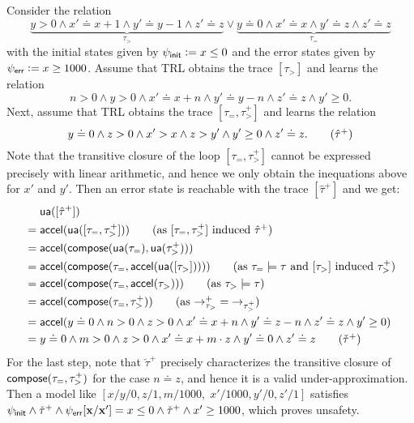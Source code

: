 \begin{example}
  Consider the relation
  \[
    \underbrace{y > 0 \land x' \doteq x + 1 \land y' \doteq y - 1 \land z' \doteq z}_{\tau_>} {} \lor {} \underbrace{y \doteq 0 \land x' \doteq x \land y' \doteq z \land z' \doteq z}_{\tau_=} \tag{$\tau$}
  \]
  with the initial states given by $\psi_{\mathsf{init}} \mathrel{\mathop:}= x \leq 0$ and the error states given
  by
  $\psi_{\mathsf{err}} \mathrel{\mathop:}= x \geq 1000$.
  Assume that TRL obtains the trace $[\tau_>]$ and learns the relation
  \begin{equation}
    \label{eq:unsafe-learned1}
    n > 0 \land y > 0 \land x' \doteq x + n \land y' \doteq y - n \land z' \doteq z \land y' \geq 0. \tag{$\tau_>^+$}
  \end{equation}
  Next, assume that TRL obtains the trace $[\tau_=,\tau_>^+]$ and learns the relation
  \begin{equation}
    \label{eq:unsafe-learned1}
    y \doteq 0 \land z > 0 \land x' > x \land z > y' \land y' \geq 0 \land z' \doteq z. \tag{$\hat{\tau}^+$}
  \end{equation}
  Note that the transitive closure of the loop $[\tau_=,\tau_>^+]$ cannot be expressed precisely with linear arithmetic, and hence we only obtain the inequations above for $x'$ and $y'$.
  Then an error state is reachable with the trace $[\hat{\tau}^+]$ and we\report{
    \pagebreak[3]} get:
  \begin{align*}
    & \underapprox([\hat{\tau}^+]) \\
    {} = {} & \accel(\underapprox([\tau_=,\tau_>^+])) \tag{as $[\tau_=,\tau_>^+]$ induced $\hat{\tau}^+$} \\
    {} = {} & \accel(\compose(\underapprox(\tau_=),\underapprox(\tau_>^+))) \\
    {} = {} & \accel(\compose(\tau_=,\accel(\underapprox([\tau_>])))) \tag{as $\tau_= \models \tau$ and $[\tau_>]$ induced $\tau_>^+$} \\
    {} = {} & \accel(\compose(\tau_=,\accel(\tau_>))) \tag{as $\tau_> \models \tau$}\\
    {} = {} & \accel(\compose(\tau_=,\tau^+_>)) \tag{as ${\to_{\tau_>}^+} = {\to_{\tau^+_>}}$} \\
    {} = {} & \accel(y \doteq 0 \land n > 0 \land z > 0 \land x' \doteq x + n \land y' \doteq z - n \land z' \doteq z \land y' \geq 0) \\
    {} = {} & y \doteq 0 \land m > 0 \land z > 0 \land x' \doteq x + m \cdot z \land y' \doteq 0 \land z' \doteq z \tag{$\check{\tau}^+$}
  \end{align*}
  For the last step, note that $\check{\tau}^+$ precisely characterizes the transitive closure of ${\mathsf{compose}}(\tau_=,\tau^+_>)$ for the case $n \doteq z$, and hence it is a valid under-approximation.
  Then a model like $[x/y/0, z/1, m/1000, \; 
 x'/1000,  y'/0,z'/1]$ satisfies $\psi_{\mathsf{init}} \land \check{\tau}^+ \land \psi_{\mathsf{err}}[\bm{\mathrm{x}}/\bm{\mathrm{x}}'] = x \leq 0 \land \check{\tau}^+ \land x' \geq 1000$, which proves unsafety.
\end{example}
